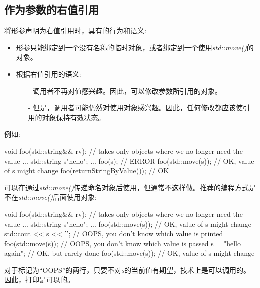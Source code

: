 \subsection{作为参数的右值引用}

将形参声明为右值引用时，具有的行为和语义:

\begin{itemize}
	\item 形参只能绑定到一个没有名称的临时对象，或者绑定到一个使用\textit{std::move()}的对象。
	\item 根据右值引用的语义:
	\begin{itemize}
		\item[-] 调用者不再对值感兴趣。因此，可以修改参数所引用的对象。
		\item[-] 但是，调用者可能仍然对使用对象感兴趣。因此，任何修改都应该使引用的对象保持有效状态。
	\end{itemize}
\end{itemize}

例如:

\begin{cppcode}
void foo(std::string&& rv); // takes only objects where we no longer need the value
...
std::string s{"hello"};
...
foo(s); // ERROR
foo(std::move(s)); // OK, value of s might change
foo(returnStringByValue()); // OK
\end{cppcode}

可以在通过\textit{std::move()}传递命名对象后使用，但通常不这样做。推荐的编程方式是不在\textit{std::move()}后面使用对象:

\begin{cppcode}
void foo(std::string&& rv); // takes only objects where we no longer need the value
...
std::string s{"hello"};
...
foo(std::move(s)); // OK, value of s might change
std::cout << s << '\n'; // OOPS, you don’t know which value is printed
foo(std::move(s)); // OOPS, you don’t know which value is passed
s = "hello again"; // OK, but rarely done
foo(std::move(s)); // OK, value of s might change
\end{cppcode}

对于标记为“OOPS”的两行，只要不对\textit{s}的当前值有期望，技术上是可以调用的。因此，打印是可以的。




